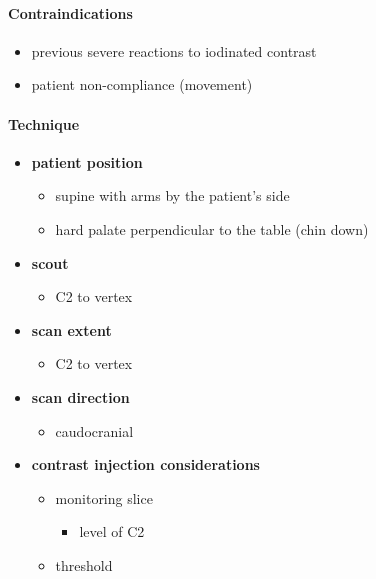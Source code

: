 \paragraph{Contraindications}

\begin{itemize}
	\item
	previous severe reactions to iodinated contrast
	\item
	patient non-compliance (movement)
\end{itemize}


\paragraph{Technique}

\begin{itemize}
	\item
	\textbf{patient position}
	
	\begin{itemize}
		\item
		\textbf{\hspace{0pt}}supine with arms by the patient's side
		\item
		hard palate perpendicular to the table (chin down)
	\end{itemize}
	\item
	\textbf{scout}
	
	\begin{itemize}
		\item
		C2 to vertex
	\end{itemize}
	\item
	\textbf{scan extent}
	
	\begin{itemize}
		\item
		C2 to vertex
	\end{itemize}
	\item
	\textbf{scan direction}
	
	\begin{itemize}
		\item
		caudocranial
	\end{itemize}
	\item
	\textbf{contrast injection considerations}
	
	\begin{itemize}
		\item
		monitoring slice
		
		\begin{itemize}
			\item
			level of C2
		\end{itemize}
		\item
		threshold
		

\end{itemize}
\end{itemize}
